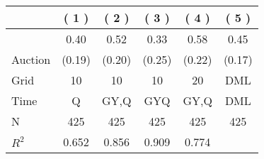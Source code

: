 
\begin{tabular}{lccccc}
\toprule
 & ( 1 ) & ( 2 ) & ( 3 ) & ( 4 ) & ( 5 )\\
\midrule
 & 0.40 & 0.52 & 0.33 & 0.58 & 0.45\\

\multirow{-2}{*}{\raggedright\arraybackslash Auction} & (0.19) & (0.20) & (0.25) & (0.22) & (0.17)\\

\midrule
Grid & 10 & 10 & 10 & 20 & DML\\

Time & Q & GY,Q & GYQ & GY,Q & DML\\

N & 425 & 425 & 425 & 425 & 425\\

$R^2$ & 0.652 & 0.856 & 0.909 & 0.774 & \\
\bottomrule
\end{tabular}
